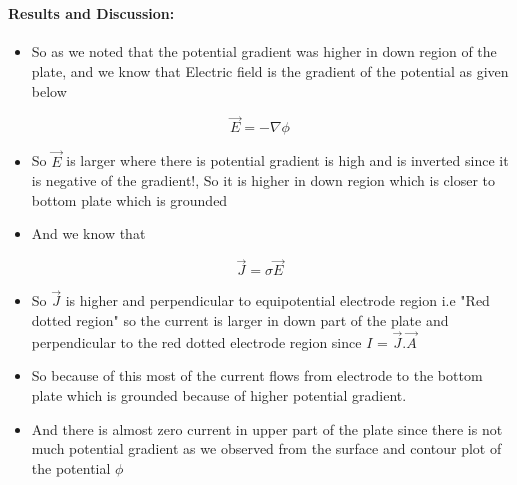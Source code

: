 \documentclass[11pt]{article}
\providecommand{\tightlist}{%
      \setlength{\itemsep}{0pt}\setlength{\parskip}{0pt}}
\begin{document}
	

	

    \begin{center}
    \end{center}
    { \hspace*{\fill} \\}
    
	
		
    \paragraph{Results and Discussion:}\label{results-and-discussion}

\begin{itemize}
\tightlist
\item
  So as we noted that the potential gradient was higher in down region
  of the plate, and we know that Electric field is the gradient of the
  potential as given below
\end{itemize}

\begin{equation}
\vec{E} = -\nabla{\phi}
   \end{equation}

\begin{itemize}
\tightlist
\item
  So \(\vec{E}\) is larger where there is potential gradient is high and
  is inverted since it is negative of the gradient!, So it is higher in
  down region which is closer to bottom plate which is grounded
\item
  And we know that
\end{itemize}

\begin{equation}
\vec{J} = \sigma\vec{E}
   \end{equation}

\begin{itemize}
\tightlist
\item
  So \(\vec{J}\) is higher and perpendicular to equipotential electrode
  region i.e "Red dotted region" so the current is larger in down part
  of the plate and perpendicular to the red dotted electrode region
  since \(I\) = \(\vec{J}.\vec{A}\)
\item
  So because of this most of the current flows from electrode to the
  bottom plate which is grounded because of higher potential gradient.
\item
  And there is almost zero current in upper part of the plate since
  there is not much potential gradient as we observed from the surface
  and contour plot of the potential \(\phi\)
\end{itemize}
\end{document}
